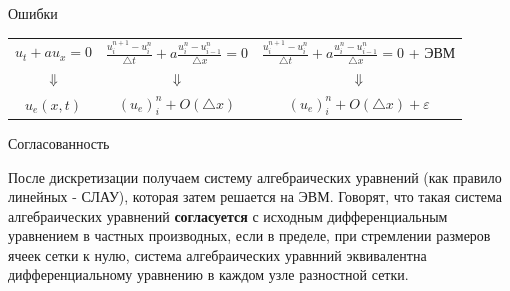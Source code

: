 \documentclass[10pt,xcolor=pst,aspectratio=169]{beamer}
\begin{document}
%
%
%

\begin{frame}{Ошибки}

    \transdissolve[duration=0.1]
    \justifying
    \large

    \begin{center}
        \begin{tabular}{|c|c|c|}
            $u_{t} + a u_{x} = 0$
            &
            $\frac{u^{n + 1}_{i} - u^{n}_{i}}{\triangle t} + a \frac{u^{n}_{i} - u^{n}_{i - 1}}{\triangle x} = 0$
            &
            $\frac{u^{n + 1}_{i} - u^{n}_{i}}{\triangle t} + a \frac{u^{n}_{i} - u^{n}_{i - 1}}{\triangle x} = 0$ + ЭВМ
            \\
            $\Downarrow$ & $\Downarrow$ & $\Downarrow$ \\
            $u_{e} \left( x, t\right)$ & $\left( u_{e} \right)^{n}_{i} + \mathit{O} \left( \triangle x \right)$ & $\left( u_{e} \right)^{n}_{i} + \mathit{O} \left( \triangle x \right) + \varepsilon$ \\
        \end{tabular}
    \end{center}

\end{frame}

\begin{frame}{Согласованность}

	\transdissolve[duration=0.1]
	\justifying
	\large

	После дискретизации получаем систему алгебраических уравнений (как правило линейных - СЛАУ), которая затем решается на ЭВМ. Говорят, что такая система алгебраических уравнений \textbf{согласуется} с исходным дифференциальным уравнением в частных производных, если в пределе, при стремлении размеров ячеек сетки к нулю, система алгебраических уравнний эквивалентна дифференциальному уравнению в каждом  узле разностной сетки.

\end{frame}
\end{document}
